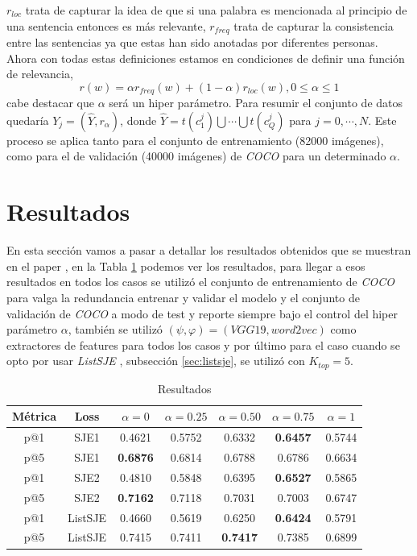 $r_{loc}$ trata de capturar la idea de que si una palabra es mencionada al principio de una sentencia entonces es más relevante, $r_{freq}$ trata de capturar la consistencia entre las sentencias ya que estas han sido anotadas por diferentes personas. Ahora con todas estas definiciones estamos en condiciones de definir una función de relevancia, \[r(w) = \alpha r_{freq}(w) + (1 - \alpha) r_{loc}(w), 0 \leqslant \alpha \leqslant 1\] cabe destacar que $\alpha$ será un hiper parámetro. Para resumir el conjunto de datos quedaría $Y_{j} =( \hat{Y}, r_{\alpha}) $, donde  $\hat{Y} = t(c_{1}^{j}) \bigcup \cdots \bigcup t(c_{Q}^{j})$ para $j = 0, \cdots , N$. Este proceso se aplica tanto para el conjunto de entrenamiento (82000 imágenes), como para el de validación (40000 imágenes) de \textit{COCO} para un determinado $\alpha$.


\section{Resultados}

En esta sección vamos a pasar a detallar los resultados obtenidos que se muestran en el paper \cite{PaperDirectors}, en la Tabla \ref{tab:results} podemos ver los resultados, para llegar a esos resultados en todos los casos se utilizó el conjunto de entrenamiento de \textit{COCO} para valga la redundancia entrenar y validar el modelo y el conjunto de validación de \textit{COCO} a modo de test y reporte siempre bajo el control del hiper parámetro $\alpha$, también se utilizó $(\psi, \varphi) = (VGG19, word2vec)$ como extractores de features para todos los casos y por último para el caso cuando se opto por usar \textit{ListSJE} , subsección \ref{sec:listsje}, se utilizó con $K_{top} = 5$.

\begin{table}[ht]
    \centering
    \begin{tabular}{|c|c|c|c|c|c|c|}
        \hline
        \textbf{Métrica} &
        \textbf{Loss} &
        \textbf{$\alpha = 0$} &
        \textbf{$\alpha = 0.25$} &
        \textbf{$\alpha = 0.50$} &
        \textbf{$\alpha = 0.75$} &
        \textbf{$\alpha = 1$}\\
        \hline \hline
        p@1 & SJE1 & 0.4621 & 0.5752 & 0.6332 & \textbf{0.6457} & 0.5744 \\
        p@5 & SJE1 & \textbf{0.6876} & 0.6814 & 0.6788 & 0.6786 & 0.6634 \\
        p@1 & SJE2 & 0.4810 & 0.5848 & 0.6395 & \textbf{0.6527} & 0.5865 \\
        p@5 & SJE2 & \textbf{0.7162} & 0.7118 & 0.7031 & 0.7003 & 0.6747 \\
        p@1 & ListSJE & 0.4660 & 0.5619 & 0.6250 & \textbf{0.6424} & 0.5791 \\
        p@5 & ListSJE & 0.7415 & 0.7411 & \textbf{0.7417} & 0.7385 & 0.6899 \\
        \hline
    \end{tabular}
    \caption{Resultados}
    \label{tab:results}
\end{table}